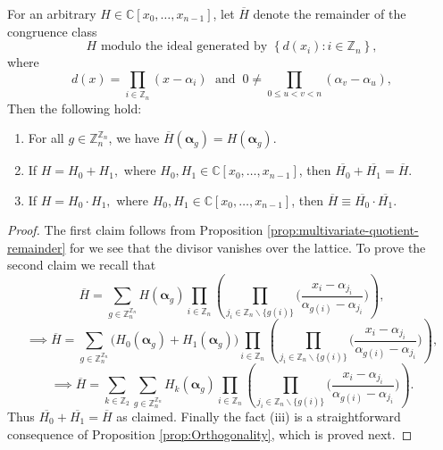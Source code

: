 \begin{proposition}\label{prop:ring-homomorphism}
For an arbitrary $H\in\mathbb{C}\left[x_{0},\ldots,x_{n-1}\right]$, let $\overline{H}$ denote
the {remainder} of the congruence class 
\[
H\text{ modulo the ideal generated by }\left\{ d(x_{i}):i\in\mathbb{Z}_{n}\right\} ,
\]
where
\[
d(x)=\prod_{i\in\mathbb{Z}_{n}}(x-\alpha_{i})\;\text{ and }\:0\ne\prod_{0\le u<v<n}(\alpha_{v}-\alpha_{u}),
\]
Then the following hold:
\begin{enumerate}
    \item For all $g\in\mathbb{Z}_{n}^{\mathbb{Z}_{n}}$, we have $\overline{H}(\boldsymbol{\alpha}_g)=H(\boldsymbol{\alpha}_g)$. 
    \item If $H = H_0 + H_1,$ where $H_0, H_1 \in \mathbb{C}\left[x_{0},\ldots,x_{n-1}\right]$, then $\overline{H_0} + \overline{H_1} = \overline{H}$.
    \item If $H = H_0 \cdot H_1,$ where $H_0, H_1 \in \mathbb{C}\left[x_{0},\ldots,x_{n-1}\right]$,  then $ \overline{H} \equiv \overline{H_0} \cdot \overline{H_1}$.
\end{enumerate}
 \end{proposition}
\begin{proof}
  The first claim follows from Proposition \ref{prop:multivariate-quotient-remainder} for we see that the divisor vanishes over the lattice. To prove the second claim we recall that
  \[
\overline{H}=\sum_{g\in\mathbb{Z}_{n}^{\mathbb{Z}_{n}}}H(\boldsymbol{\alpha}_{g})\prod_{i\in\mathbb{Z}_{n}}\left(\prod_{j_{i}\in\mathbb{Z}_{n}\backslash\{g(i)\}}\bigg(\frac{x_{i}-\alpha_{j_{i}}}{\alpha_{g(i)}-\alpha_{j_{i}}}\bigg)\right),
  \]
  \[
  \implies\overline{H}=\sum_{g\in\mathbb{Z}_{n}^{\mathbb{Z}_{n}}}\big(H_{0}(\boldsymbol{\alpha}_{g})+H_{1}(\boldsymbol{\alpha}_{g})\big)\prod_{i\in\mathbb{Z}_{n}}\left(\prod_{j_{i}\in\mathbb{Z}_{n}\backslash\{g(i)\}}\bigg(\frac{x_{i}-\alpha_{j_{i}}}{\alpha_{g(i)}-\alpha_{j_{i}}}\bigg)\right),
  \]
  \[
  \implies\overline{H}=\sum_{k\in\mathbb{Z}_{2}}\sum_{g\in\mathbb{Z}_{n}^{\mathbb{Z}_{n}}}H_{k}(\boldsymbol{\alpha}_{g})\prod_{i\in\mathbb{Z}_{n}}\left(\prod_{j_{i}\in\mathbb{Z}_{n}\backslash\{g(i)\}}\bigg(\frac{x_{i}-\alpha_{j_{i}}}{\alpha_{g(i)}-\alpha_{j_{i}}}\bigg)\right).
  \]
  Thus $\overline{H_0} + \overline{H_1} = \overline{H}$ as claimed. Finally the fact (iii) is a straightforward consequence of Proposition \ref{prop:Orthogonality}, which is proved next.
\end{proof}

